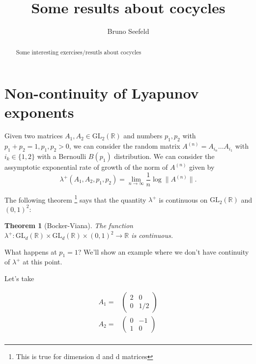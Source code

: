 \documentclass{article}
\title{Some results about cocycles}
\author{Bruno Seefeld}
\newtheorem{theorem}{Theorem}[section]
\begin{document}
\maketitle


\begin{abstract}
Some interesting exercises/resutls about cocycles
\end{abstract}



\section{Non-continuity of Lyapunov exponents}

Given two matrices $A_1,A_2\in \text{GL}_2(\mathbb{R})$ and 
numbers $p_1,p_2$ with $p_1+p_2=1,p_1,p_2>0$, we can consider
the random matrix $A^(n)=A_{i_n}\ldots A_{i_1}$ with $i_k\in\{1,2\}$
with a Bernoulli $B(p_1)$ distribution. We can consider the assymptotic
exponential rate of growth of the  norm of $A^{(n)}$ given by 
\begin{equation}
\lambda^+(A_1,A_2,p_1,p_2)=\lim_{n\to \infty}\frac{1}{n}\log \|A^{(n)}\|.
\end{equation}

The following theorem \footnote{This is true for dimension d and d matrices} says that the quantity $\lambda^+$ is continuous
on $\text{GL}_2(\mathbb{R})$ and $(0,1)^2$:

\begin{theorem}[Bocker-Viana]
    The function $\lambda^+: \text{GL}_d(\mathbb{R})\times \text{GL}_d(\mathbb{R}) \times (0,1)^2\to \mathbb{R} $
    is continuous. 
\end{theorem}


What happens at $p_1=1$? We'll show an example where we don't have continuity
of $\lambda^+$ at this point. 

Let's take

\begin{align*}
    A_1=&
    \begin{pmatrix}
        2 & 0 \\
        0 & 1/2
    \end{pmatrix}\\
    A_2=&
    \begin{pmatrix}
        0 & -1 \\
        1 & 0
    \end{pmatrix}\\
\end{align*}
\end{document}
